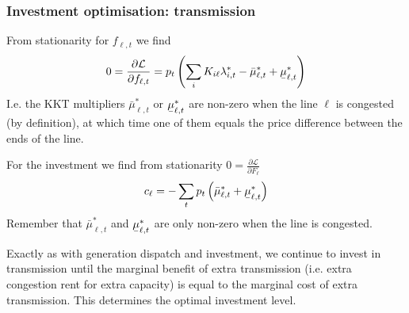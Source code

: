 \documentclass[10pt,aspectratio=169,dvipsnames]{beamer}
\def\l{\lambda}
\def\d{\partial}
\def\cL{\mathcal{L}}
\newcommand{\ubar}[1]{\text{\b{$#1$}}}
\begin{document}
\begin{frame}[fragile]
  \frametitle{Investment optimisation: transmission}

  From stationarity for $f_{\ell,t}$ we find
  \begin{equation*}
    0 = \frac{\d \cL}{\d f_{\ell,t}} = p_t \left(\sum_i K_{i\ell} \l_{i,t}^* - \bar{\mu}_{\ell,t}^* + \ubar{\mu}_{\ell,t}^* \right)
  \end{equation*}
  I.e. the KKT multipliers $\bar{\mu}_{\ell,t}^*$ or
  $\ubar{\mu}_{\ell,t}^*$ are non-zero when the line $\ell$ is congested (by definition), at which time one of them equals
  the price difference between the ends of the line.

  For the investment we find from stationarity $0 = \frac{\d \cL}{\d F_{\ell}}$
  \begin{equation*}
    c_\ell = - \sum_t p_t \left(\bar{\mu}_{\ell,t}^* + \ubar{\mu}_{\ell,t}^* \right)
  \end{equation*}
  Remember that $\bar{\mu}_{\ell,t}^*$ and $\ubar{\mu}_{\ell,t}^*$ are only non-zero when the line is congested.

  Exactly as with generation dispatch and investment, we
  continue to invest in transmission until the marginal benefit of
  extra transmission (i.e. extra congestion rent for extra capacity)
  is equal to the marginal cost of extra transmission. This determines
  the optimal investment level.


\end{frame}
\end{document}
